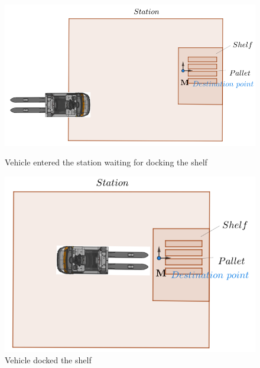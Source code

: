 \begin{figure}[H]
    \begin{center}
    \begin{minipage}[b]{0.6\linewidth}  %
        \includegraphics[width=\linewidth]{images/Chap0/dock_wait.png}
        \caption{Vehicle entered the station waiting for docking the shelf}
        \label{dock_wait}
    \end{minipage}
    \hspace{0.02\linewidth}  %
    \begin{minipage}[b]{0.5\linewidth}  %
        \includegraphics[width=\linewidth]{images/Chap0/dock_done.png}
        \caption{Vehicle docked the shelf}
        \label{dock_done}
    \end{minipage}
    \end{center}
\end{figure}

